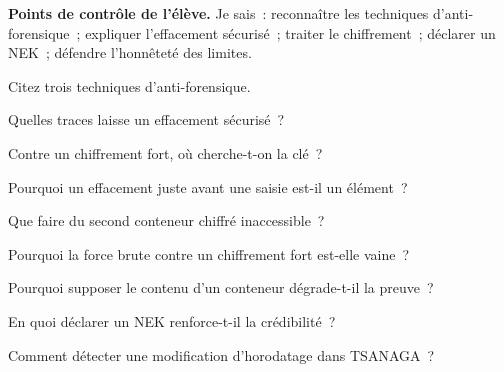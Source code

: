 \begin{boxinfo}
\textbf{Points de contrôle de l'élève.} Je sais~: reconnaître les techniques
d'anti-forensique~; expliquer l'effacement sécurisé~; traiter le
chiffrement~; déclarer un NEK~; défendre l'honnêteté des limites.
\end{boxinfo}

\bigskip

\begin{boxexo}[title={\ding{45}\quad Exercice~16.1. Techniques \niveaubase}]
Citez trois techniques d'anti-forensique.
\end{boxexo}

\begin{boxexo}[title={\ding{45}\quad Exercice~16.2. Effacement \niveaubase}]
Quelles traces laisse un effacement sécurisé~?
\end{boxexo}

\begin{boxexo}[title={\ding{45}\quad Exercice~16.3. Chiffrement \niveaubase}]
Contre un chiffrement fort, où cherche-t-on la clé~?
\end{boxexo}

\begin{boxexo}[title={\ding{45}\quad Exercice~16.4. L'effacement comme indice \niveaumoyen}]
Pourquoi un effacement juste avant une saisie est-il un élément~?
\end{boxexo}

\begin{boxexo}[title={\ding{45}\quad Exercice~16.5. NEK \niveaumoyen}]
Que faire du second conteneur chiffré inaccessible~?
\end{boxexo}

\begin{boxexo}[title={\ding{45}\quad Exercice~16.6. Force brute \niveaumoyen}]
Pourquoi la force brute contre un chiffrement fort est-elle vaine~?
\end{boxexo}

\begin{boxexo}[title={\ding{45}\quad Exercice~16.7. CRO \niveaumoyen}]
Pourquoi supposer le contenu d'un conteneur dégrade-t-il la preuve~?
\end{boxexo}

\begin{boxexo}[title={\ding{45}\quad Exercice~16.8. Honnêteté \niveaumoyen}]
En quoi déclarer un NEK renforce-t-il la crédibilité~?
\end{boxexo}

\begin{boxexo}[title={\ding{45}\quad Exercice~16.9. Détecter \niveauexpert}]
Comment détecter une modification d'horodatage dans TSANAGA~?
\end{boxexo}

